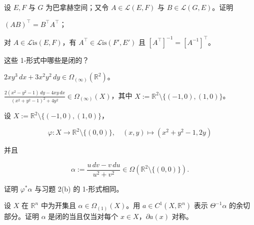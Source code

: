 \begin{exercises}
\item

设 $ E, F $ 与 $ G $ 为巴拿赫空间；又令 $ A \in \mathcal{L}(E, F) $ 与 $ B \in \mathcal{L}(G, E) $。证明

\begin{items}
\item

$ (AB)^{\top} = B^{\top}A^{\top} $；

\item

对 $ A \in \mathcal{L}\mathrm{is}(E, F) $，有 $ A^{\top} \in \mathcal{L}\mathrm{is}(F', E') $ 且 $ [A^{\top}]^{-1} = [A^{-1}]^{\top} $。

\end{items}

\item

这些 1-形式中哪些是闭的？

\begin{items}
\item

$ 2xy^{3}\,dx + 3x^{2}y^{2}\,dy \in \Omega_{(\infty)}(\mathbb{R}^{2}) $。

\item

$ \frac{2(x^{2} - y^{2} - 1)\,dy - 4xy\,dx}{(x^{2} + y^{2} - 1)^{2} + 4y^{2}} \in \Omega_{(\infty)}(X) $，其中 $ X := \mathbb{R}^{2}\setminus\{(-1,0),(1,0)\} $。

\end{items}

\item

设 $ X := \mathbb{R}^{2}\setminus\{(-1,0),(1,0)\} $，

\[
\varphi : X \to \mathbb{R}^{2}\setminus\{(0,0)\} , \quad (x, y) \mapsto (x^{2} + y^{2} - 1, 2y)
\]

并且

\[
\alpha := \frac{u\,dv - v\,du}{u^{2} + v^{2}} \in \Omega(\mathbb{R}^{2}\setminus\{(0,0)\}) .
\]

证明 $ \varphi^{*}\alpha $ 与习题 2(b) 的 1-形式相同。

\item

设 $ X $ 在 $ \mathbb{R}^{n} $ 中为开集且 $ \alpha \in \Omega_{(1)}(X) $。用 $ a \in C^{1}(X, \mathbb{R}^{n}) $ 表示 $ \Theta^{-1}\alpha $ 的余切部分。证明 $ \alpha $ 是闭的当且仅当对每个 $ x \in X $，$ \partial a(x) $ 对称。


\end{exercises}
